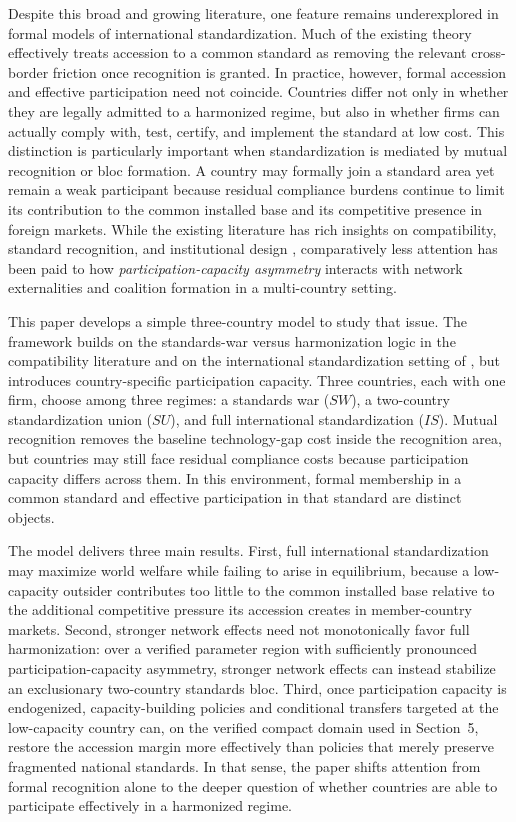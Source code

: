 Despite this broad and growing literature, one feature remains underexplored in formal models of international standardization. Much of the existing theory effectively treats accession to a common standard as removing the relevant cross-border friction once recognition is granted. In practice, however, formal accession and effective participation need not coincide. Countries differ not only in whether they are legally admitted to a harmonized regime, but also in whether firms can actually comply with, test, certify, and implement the standard at low cost. This distinction is particularly important when standardization is mediated by mutual recognition or bloc formation. A country may formally join a standard area yet remain a weak participant because residual compliance burdens continue to limit its contribution to the common installed base and its competitive presence in foreign markets. While the existing literature has rich insights on compatibility, standard recognition, and institutional design \citep{FarrellSaloner1985,KatzShapiro1985,GandalShy2001,BarrettYang2001,Costinot2008,Klimenko2009}, comparatively less attention has been paid to how \emph{participation-capacity asymmetry} interacts with network externalities and coalition formation in a multi-country setting.

This paper develops a simple three-country model to study that issue. The framework builds on the standards-war versus harmonization logic in the compatibility literature \citep{FarrellSaloner1985,KatzShapiro1985,KatzShapiro1986,KatzShapiro1994} and on the international standardization setting of \citet{GandalShy2001}, but introduces country-specific participation capacity. Three countries, each with one firm, choose among three regimes: a standards war ($SW$), a two-country standardization union ($SU$), and full international standardization ($IS$). Mutual recognition removes the baseline technology-gap cost inside the recognition area, but countries may still face residual compliance costs because participation capacity differs across them. In this environment, formal membership in a common standard and effective participation in that standard are distinct objects.

The model delivers three main results. First, full international standardization may maximize world welfare while failing to arise in equilibrium, because a low-capacity outsider contributes too little to the common installed base relative to the additional competitive pressure its accession creates in member-country markets. Second, stronger network effects need not monotonically favor full harmonization: over a verified parameter region with sufficiently pronounced participation-capacity asymmetry, stronger network effects can instead stabilize an exclusionary two-country standards bloc. Third, once participation capacity is endogenized, capacity-building policies and conditional transfers targeted at the low-capacity country can, on the verified compact domain used in Section~5, restore the accession margin more effectively than policies that merely preserve fragmented national standards. In that sense, the paper shifts attention from formal recognition alone to the deeper question of whether countries are able to participate effectively in a harmonized regime.

